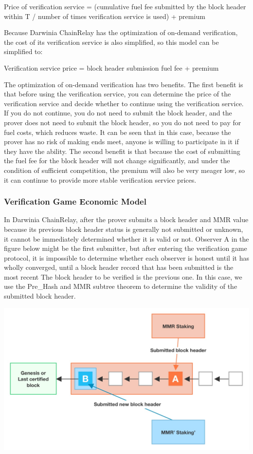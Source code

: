 \begin{center}
Price of verification service = (cumulative fuel fee submitted by the block header within T / number of times verification service is used) + premium

Because Darwinia ChainRelay has the optimization of on-demand verification, the cost of its verification service is also simplified, so this model can be simplified to:

Verification service price = block header submission fuel fee + premium
    
\end{center}

The optimization of on-demand verification has two benefits. The first benefit is that before using the verification service, you can determine the price of the verification service and decide whether to continue using the verification service. If you do not continue, you do not need to submit the block header, and the prover does not need to submit the block header, so you do not need to pay for fuel costs, which reduces waste. It can be seen that in this case, because the prover has no risk of making ends meet, anyone is willing to participate in it if they have the ability. The second benefit is that because the cost of submitting the fuel fee for the block header will not change significantly, and under the condition of sufficient competition, the premium will also be very meager low, so it can continue to provide more stable verification service prices.

\subsubsection*{Verification Game Economic Model}

In Darwinia ChainRelay, after the prover submits a block header and MMR value because its previous block header status is generally not submitted or unknown, it cannot be immediately determined whether it is valid or not. Observer A in the figure below might be the first submitter, but after entering the verification game protocol, it is impossible to determine whether each observer is honest until it has wholly converged, until a block header record that has been submitted is the most recent The block header to be verified is the previous one. In this case, we use the Pre\_Hash and MMR subtree theorem to determine the validity of the submitted block header.


\includegraphics[scale=0.2]{pic/Verification Game Economic Model 1.jpg}


